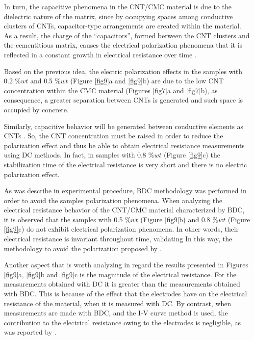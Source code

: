 \documentclass[twocolumn]{bmcart}%
\begin{document}
In turn, the capacitive phenomena in the CNT/CMC material is due to the dielectric nature of the matrix, since by occupying spaces among conductive clusters of CNTs, capacitor-type arrangements are created within the material. As a result, the charge of the “capacitors”, formed between the CNT clusters and the cementitious matrix, causes the electrical polarization phenomena that it is reflected in a constant growth in electrical resistance over time \cite{Dong2016}.

Based on the previous idea, the electric polarization effects in the samples with 0.2 $\%wt$ and 0.5 $\%wt$ (Figure \ref{fig9}a and \ref{fig9}b) are due to the low CNT concentration within the CMC material (Figures \ref{fig7}a and \ref{fig7}b), as consequence, a greater separation between CNTs is generated and such space is occupied by concrete.  

Similarly, capacitive behavior will be generated between conductive elements as CNTs \cite{Garcia-Macias2017a, Downey2017, Dong2016, Balberg1984}. So, the CNT concentration must be raised in order to reduce the polarization effect and thus be able to obtain electrical resistance measurements using DC methods. In fact, in samples with 0.8 $\%wt$ (Figure \ref{fig9}c) the stabilization time of the electrical resistance is very short and there is no electric polarization effect.

As was describe in experimental procedure, BDC methodology was performed in order to avoid the samples polarization phenomena. When analyzing the electrical resistance behavior of the CNT/CMC material characterized by BDC, it is observed that the samples with 0.5 $\%wt$ (Figure \ref{fig9}b) and 0.8 $\%wt$ (Figure \ref{fig9}c) do not exhibit electrical polarization phenomena. In other words, their electrical resistance is invariant throughout time, validating In this way, the methodology  to avoid the polarization proposed by  \cite{Downey2017a, DAlessandro2017}.

Another aspect that is worth analyzing in regard the results presented in Figures \ref{fig9}a, \ref{fig9}b and \ref{fig9}c is the magnitude of the electrical resistance. For the measurements obtained with DC it is greater than the measurements obtained with BDC. This is because of the effect that the electrodes have on the electrical resistance of the material, when it is measured with DC. By contrast, when measurements are made with BDC, and the I-V curve method is used, the contribution to the electrical resistance owing to the electrodes is negligible, as was reported by  \cite{Konsta-Gdoutos2014}.
\end{document}
